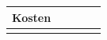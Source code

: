 \begin{landscape}
\begin{table}[]
{\begin{tabular}{lllllll}
\textbf{Kosten}                                                             &                                                                                                                                                                                                                                                                &                                                                                                                                                                                                                                                                &                         & \multicolumn{3}{l}{}                                                                                                                                                                                                                                                                                                                                                                                                                                        \\ \hline
\multicolumn{7}{l}{\textbf{}}                                                                                                                                                                                                                                                                                                                                                                                                                                                                                                                                                                                                                                                                                                                                                                                                                                                                                                                                                                                                                                                                         \\

\end{tabular}}
\end{table}
\end{landscape}
